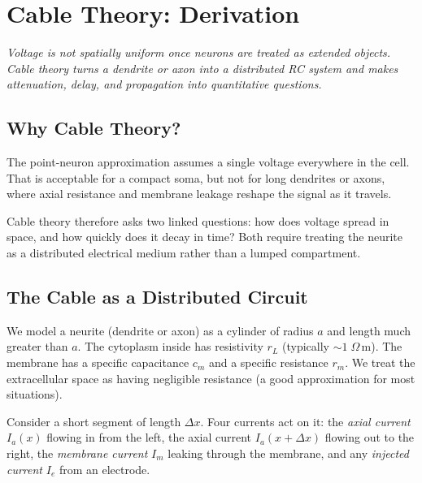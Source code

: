 \chapter{Cable Theory: Derivation}
\label{ch:cable}

\textit{Voltage is not spatially uniform once neurons are treated as extended objects. Cable theory turns a dendrite or axon into a distributed RC system and makes attenuation, delay, and propagation into quantitative questions.}

\section{Why Cable Theory?}
\label{sec:why-cable}

The point-neuron approximation assumes a single voltage everywhere in the cell. That is acceptable for a compact soma, but not for long dendrites or axons, where axial resistance and membrane leakage reshape the signal as it travels.

Cable theory therefore asks two linked questions: how does voltage spread in space, and how quickly does it decay in time? Both require treating the neurite as a distributed electrical medium rather than a lumped compartment.

\section{The Cable as a Distributed Circuit}
\label{sec:cable-circuit}

We model a neurite (dendrite or axon) as a cylinder of radius $a$ and length much greater than $a$. The cytoplasm inside has resistivity $r_L$ (typically $\sim 1\;\Omega\,\text{m}$). The membrane has a specific capacitance $c_m$ and a specific resistance $r_m$. We treat the extracellular space as having negligible resistance (a good approximation for most situations).

Consider a short segment of length $\Delta x$. Four currents act on it: the \emph{axial current} $I_a(x)$ flowing in from the left, the axial current $I_a(x + \Delta x)$ flowing out to the right, the \emph{membrane current} $I_m$ leaking through the membrane, and any \emph{injected current} $I_e$ from an electrode.

